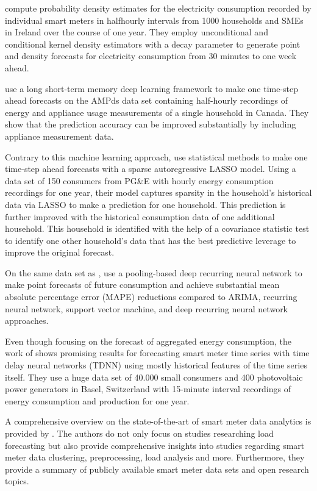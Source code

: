 \citet{Arora:2016} compute probability density estimates for the electricity consumption recorded by individual smart meters in halfhourly intervals from 1000 households and SMEs in Ireland over the course of one year. They employ unconditional and conditional kernel density estimators with a decay parameter to generate point and density forecasts for electricity consumption from 30 minutes to one week ahead.

\citet{Kong:2018} use a long short-term memory deep learning framework to make one time-step ahead forecasts on the AMPds data set containing half-hourly recordings of energy and appliance usage measurements of a single household in Canada. They show that the prediction accuracy can be improved substantially by including appliance measurement data.

Contrary to this machine learning approach, \citet{Li:2017} use statistical methods to make one time-step ahead forecasts with a sparse autoregressive LASSO model. Using a data set of 150 consumers from PG\&E with hourly energy consumption recordings for one year, their model captures sparsity in the household’s historical data via LASSO to make a prediction for one household. This prediction is further improved with the historical consumption data of one additional household. This household is identified with the help of a covariance statistic test to identify one other household's data that has the best predictive leverage to improve the original forecast.

On the same data set as \citet{Arora:2016}, \citet{Shi:2017} use a pooling-based deep recurring neural network to make point forecasts of future consumption and achieve substantial mean absolute percentage error (MAPE) reductions compared to ARIMA, recurring neural network, support vector machine, and deep recurring neural network approaches.

Even though focusing on the forecast of aggregated energy consumption, the work of \citet{Zufferey:2017} shows promising results for forecasting smart meter time series with time delay neural networks (TDNN) using mostly historical features of the time series itself. They use a huge data set of 40.000 small consumers and 400 photovoltaic power generators in Basel, Switzerland with 15-minute interval recordings of energy consumption and production for one year.

A comprehensive overview on the state-of-the-art of smart meter data analytics is provided by \citet{Wang:2018}. The authors do not only focus on studies researching load forecasting but also provide comprehensive insights into studies regarding smart meter data clustering, preprocessing, load analysis and more. Furthermore, they provide a summary of publicly available smart meter data sets and open research topics.

